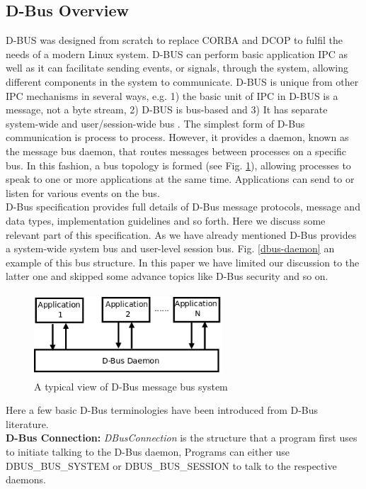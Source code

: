 \documentclass{ifacconf}
\begin{document}
\subsection{D-Bus Overview}
D-BUS was designed from scratch to replace CORBA and DCOP  to fulfil the needs of a modern Linux system. D-BUS can perform basic application IPC as well as it can facilitate sending events, or signals, through the system, allowing different components in the system to communicate. D-BUS is unique from other IPC mechanisms in several ways, e.g. 1) the basic unit of IPC in D-BUS is a message, not a byte stream, 2) D-BUS is bus-based and 3) It has separate system-wide and user/session-wide bus \cite{Love2005} . The simplest form of D-Bus communication is process to process. However, it provides a daemon, known as the message bus daemon, that routes messages between processes on a specific bus. In this fashion, a bus topology is formed (see Fig. \ref{fig:dbus-daemon}), allowing processes to speak to one or more applications at the same time. Applications can send to or listen for various events on the bus.\\
D-Bus specification \cite{Pennington+2010} provides full details of D-Bus message protocols, message and data types, implementation guidelines and so forth. Here we discuss some relevant part of this specification. As we have already mentioned D-Bus provides a system-wide system bus and user-level session bus. Fig. \ref{dbus-daemon} an example of this bus structure. In this paper we have limited our discussion to the latter one and skipped some advance topics like D-Bus security and so on.
\begin{figure}
\begin{center}
\includegraphics[width=7cm,height=3.1cm]{./dia-files/dbus-daemon} %
\caption{A typical view of D-Bus message bus system } 
\label{fig:dbus-daemon}
\end{center}
\end{figure}
Here a few basic D-Bus terminologies have been introduced from D-Bus literature.\\
\textbf{D-Bus Connection: }
\textit{DBusConnection} is the structure that a program first uses to initiate talking to the D-Bus daemon, Programs can either use DBUS\_BUS\_SYSTEM or DBUS\_BUS\_SESSION to talk to the respective daemons.\\
\end{document}

